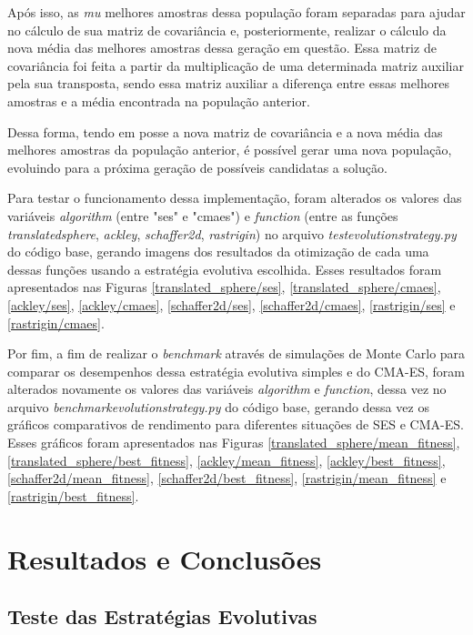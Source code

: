 \documentclass[conference]{IEEEtran}
\begin{document}
Após isso, as \textit{mu} melhores amostras dessa população foram separadas para ajudar no cálculo de sua matriz de covariância e, posteriormente, realizar o cálculo da nova média das melhores amostras dessa geração em questão. Essa matriz de covariância foi feita a partir da multiplicação de uma determinada matriz auxiliar pela sua transposta, sendo essa matriz auxiliar a diferença entre essas melhores amostras e a média encontrada na população anterior.

Dessa forma, tendo em posse a nova matriz de covariância e a nova média das melhores amostras da população anterior, é possível gerar uma nova população, evoluindo para a próxima geração de possíveis candidatas a solução.

Para testar o funcionamento dessa implementação, foram alterados os valores das variáveis \textit{algorithm} (entre "ses" e "cmaes") e \textit{function} (entre as funções \textit{translated\underline{\space}sphere}, \textit{ackley}, \textit{schaffer2d}, \textit{rastrigin}) no arquivo \textit{test\underline{\space}evolution\underline{\space}strategy.py} do código base, gerando imagens dos resultados da otimização de cada uma dessas funções usando a estratégia evolutiva escolhida. Esses resultados foram apresentados nas Figuras \ref{translated_sphere/ses}, \ref{translated_sphere/cmaes}, \ref{ackley/ses}, \ref{ackley/cmaes}, \ref{schaffer2d/ses}, \ref{schaffer2d/cmaes}, \ref{rastrigin/ses} e \ref{rastrigin/cmaes}.

Por fim, a fim de realizar o \textit{benchmark} através de simulações de Monte Carlo para comparar os desempenhos dessa estratégia evolutiva simples e do CMA-ES, foram alterados novamente os valores das variáveis \textit{algorithm} e \textit{function}, dessa vez no arquivo \textit{benchmark\underline{\space}evolution\underline{\space}strategy.py} do código base, gerando dessa vez os gráficos comparativos de rendimento para diferentes situações de SES e CMA-ES. Esses gráficos foram apresentados nas Figuras \ref{translated_sphere/mean_fitness}, \ref{translated_sphere/best_fitness}, \ref{ackley/mean_fitness}, \ref{ackley/best_fitness}, \ref{schaffer2d/mean_fitness}, \ref{schaffer2d/best_fitness}, \ref{rastrigin/mean_fitness} e \ref{rastrigin/best_fitness}.

\section{Resultados e Conclusões}

\subsection{Teste das Estratégias Evolutivas}
\end{document}
